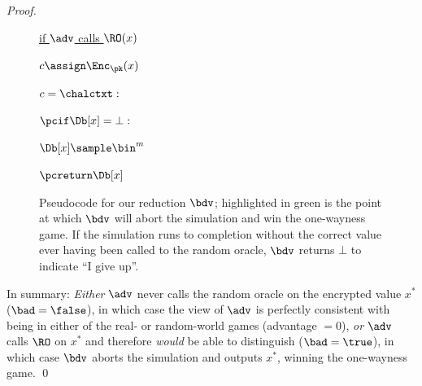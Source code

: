 \begin{proof}
\begin{figure}[t]
\begin{center}
{    			\begin{minipage}[t]{5cm}
    				\underline{if $\adv$ calls $\RO(x)$}
            \smallskip
    				\begin{nicodemus}
              \item $c \assign \Enc_\pk(x)$ 
              \smallskip
              \item \pcif $c = \chalctxt :$ 
              \smallskip
              \item   \quad {}
              \smallskip
              \item $\pcif \Db[x] = \bot :$ 
              \smallskip
              \item   \quad $\Db[x] \sample \bin^m$
              \smallskip
              \item $\pcreturn \Db[x]$
    				\end{nicodemus}	
    			\end{minipage}
    		}
    	\end{center}
    	\caption{\label{fig:cparom-red}
        Pseudocode for our reduction $\bdv$;
        highlighted in green is the point at which $\bdv$ will abort the
        simulation and win the one-wayness game. 
        If the simulation runs to completion without the correct value ever having
        been called to the random oracle, $\bdv$ returns $\bot$ to indicate 
        ``I give up''.
      }
    \end{figure}

    In summary: \emph{Either} $\adv$ never calls the
      random oracle on the encrypted value $x^*$ ($\bad = \false$), 
      in which case the view of $\adv$ is
      perfectly consistent with being in either of the real- or
      random-world games (advantage $= 0$), \emph{or} $\adv$
      calls $\RO$ on $x^*$ and therefore \emph{would} be able to
      distinguish ($\bad = \true$), in which case $\bdv$ 
      aborts the simulation and outputs $x^*$, 
      winning the one-wayness game.
    \qed
  \end{proof}

